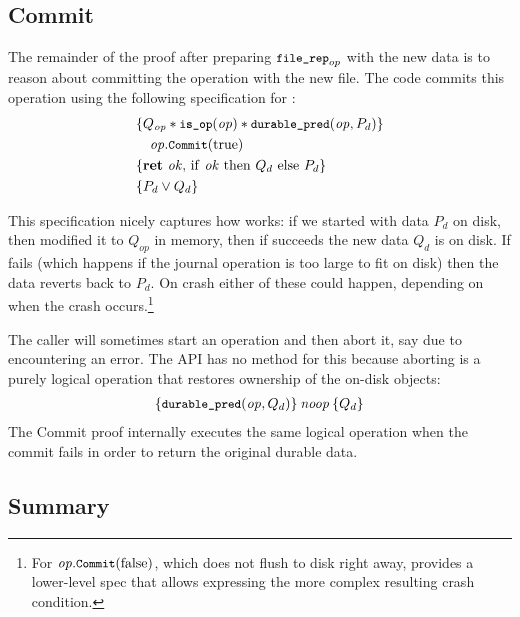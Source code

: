 \subsection{Commit}
\label{s:design:commit}

The remainder of the proof after preparing $\cc{file_rep}_{op}$ with the new
data is to reason about committing the operation with the new file. The code
commits this operation using the following specification for :
%
\begin{align*}
  \hoareCV{Q_{\mathit{op}} \sep \cc{is_op}(\mathit{op}) \sep \bufobjDurable(\mathit{op}, P_d)}%
  {\mathit{op}.\cc{Commit}(\mathrm{true})}%
  {\Ret{\mathit{ok}} \mathrm{if~} \mathit{ok} \mathrm{~then~} Q_d \mathrm{~else~} P_d}%
  {P_d \lor Q_d}
\end{align*}

This specification nicely captures how  works: if we started with data
$P_d$ on disk, then modified it to $Q_{op}$ in memory, then if  succeeds
the new data $Q_d$ is on disk. If  fails (which happens if the
journal operation is too large to fit on disk) then the data reverts back to $P_d$. On
crash either of these could happen, depending on when the crash
occurs.\footnote{For $\mathit{op}.\cc{Commit}(\mathrm{false})$, which
does not flush to disk right away, \txn provides a lower-level spec that
allows expressing the more complex resulting crash condition.}

The caller will sometimes start an operation and then abort it, say due to
encountering an error. The API has no method for this because aborting is a purely
logical operation that restores ownership of the on-disk objects:
%
\begin{align*}
  \hoare{\bufobjDurable(\mathit{op}, Q_{d})}{\SKIP}{Q_{d}}
\end{align*}
%
The Commit proof internally executes the same logical operation when the commit
fails in order to return the original durable data.

\subsection{Summary}
\label{s:design:summary}



